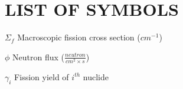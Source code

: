 \documentclass[tocnosub,noragright,centerchapter,12pt,fullpage]{uiucecethesis09}
\begin{document}


\chapter{LIST OF SYMBOLS}
\begin{symbollist}[0.7in]
\item[$\Sigma_f$] Macroscopic fission cross section ($cm^{-1}$)
\item[$\phi$] Neutron flux ($\frac{neutron}{cm^2\times s}$)
\item[$\gamma_i$] Fission yield of $i^{th}$ nuclide
\end{symbollist}

\mainmatter

%
%
%



%
%

\backmatter

%
%


\end{document}

